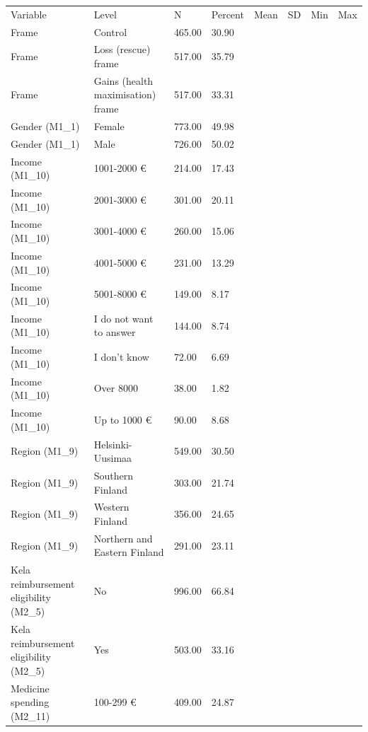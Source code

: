 \begin{tabular}{llllllll}
Variable & Level & N & Percent & Mean & SD & Min & Max \\
Frame & Control & \num{465.00} & \num{30.90} &  &  &  &  \\
Frame & Loss (rescue) frame & \num{517.00} & \num{35.79} &  &  &  &  \\
Frame & Gains (health maximisation) frame & \num{517.00} & \num{33.31} &  &  &  &  \\
Gender (M1\_1) & Female & \num{773.00} & \num{49.98} &  &  &  &  \\
Gender (M1\_1) & Male & \num{726.00} & \num{50.02} &  &  &  &  \\
Income (M1\_10) & 1001-2000 € & \num{214.00} & \num{17.43} &  &  &  &  \\
Income (M1\_10) & 2001-3000 € & \num{301.00} & \num{20.11} &  &  &  &  \\
Income (M1\_10) & 3001-4000 € & \num{260.00} & \num{15.06} &  &  &  &  \\
Income (M1\_10) & 4001-5000 € & \num{231.00} & \num{13.29} &  &  &  &  \\
Income (M1\_10) & 5001-8000 € & \num{149.00} & \num{8.17} &  &  &  &  \\
Income (M1\_10) & I do not want to answer & \num{144.00} & \num{8.74} &  &  &  &  \\
Income (M1\_10) & I don't know & \num{72.00} & \num{6.69} &  &  &  &  \\
Income (M1\_10) & Over 8000 & \num{38.00} & \num{1.82} &  &  &  &  \\
Income (M1\_10) & Up to 1000 € & \num{90.00} & \num{8.68} &  &  &  &  \\
Region (M1\_9) & Helsinki-Uusimaa & \num{549.00} & \num{30.50} &  &  &  &  \\
Region (M1\_9) & Southern Finland & \num{303.00} & \num{21.74} &  &  &  &  \\
Region (M1\_9) & Western Finland & \num{356.00} & \num{24.65} &  &  &  &  \\
Region (M1\_9) & Northern and Eastern Finland & \num{291.00} & \num{23.11} &  &  &  &  \\
Kela reimbursement eligibility (M2\_5) & No & \num{996.00} & \num{66.84} &  &  &  &  \\
Kela reimbursement eligibility (M2\_5) & Yes & \num{503.00} & \num{33.16} &  &  &  &  \\
Medicine spending (M2\_11) & 100-299 € & \num{409.00} & \num{24.87} &  &  &  &  \\

\end{tabular}
